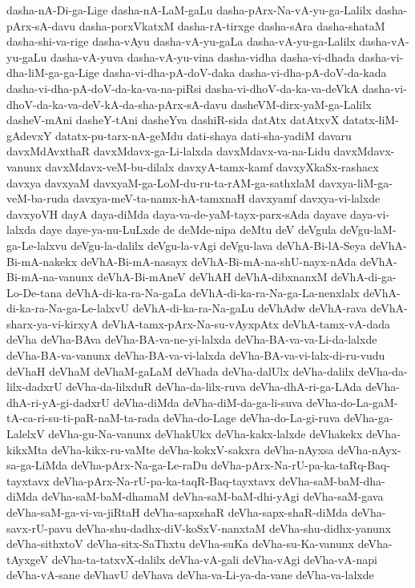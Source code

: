 {dasha-nA-Di-ga-Lige
dasha-nA-LaM-gaLu
dasha-pArx-Na-vA-yu-ga-Lalilx
dasha-pArx-sA-davu
dasha-porxVkatxM
dasha-rA-tirxge
dasha-sAra
dasha-shataM
dasha-shi-va-rige
dasha-vAyu
dasha-vA-yu-gaLa
dasha-vA-yu-ga-Lalilx
dasha-vA-yu-gaLu
dasha-vA-yuva
dasha-vA-yu-vina
dasha-vidha
dasha-vi-dhada
dasha-vi-dha-liM-ga-ga-Lige
dasha-vi-dha-pA-doV-daka
dasha-vi-dha-pA-doV-da-kada
dasha-vi-dha-pA-doV-da-ka-va-na-piRsi
dasha-vi-dhoV-da-ka-va-deVkA
dasha-vi-dhoV-da-ka-va-deV-kA-da-sha-pArx-sA-davu
dasheVM-dirx-yaM-ga-Lalilx
dasheV-mAni
dasheY-tAni
dasheYva
dashiR-sida
datAtx
datAtxvX
datatx-liM-gAdevxY
datatx-pu-tarx-nA-geMdu
dati-shaya
dati-sha-yadiM
davaru
davxMdAvxthaR
davxMdavx-ga-Li-lalxda
davxMdavx-va-na-Lidu
davxMdavx-vanunx
davxMdavx-veM-bu-dilalx
davxyA-tamx-kamf
davxyXkaSx-rashacx
davxya
davxyaM
davxyaM-ga-LoM-du-ru-ta-rAM-ga-sathxlaM
davxya-liM-ga-veM-ba-ruda
davxya-meV-ta-namx-hA-tamxnaH
davxyamf
davxya-vi-lalxde
davxyoVH
dayA
daya-diMda
daya-va-de-yaM-tayx-parx-sAda
dayave
daya-vi-lalxda
daye
daye-ya-nu-LuLxde
de
deMde-nipa
deMtu
deV
deVgula
deVgu-laM-ga-Le-lalxvu
deVgu-la-dalilx
deVgu-la-vAgi
deVgu-lava
deVhA-Bi-lA-Seya
deVhA-Bi-mA-nakekx
deVhA-Bi-mA-nasayx
deVhA-Bi-mA-na-shU-nayx-nAda
deVhA-Bi-mA-na-vanunx
deVhA-Bi-mAneV
deVhAH
deVhA-dibxnanxM
deVhA-di-ga-Lo-De-tana
deVhA-di-ka-ra-Na-gaLa
deVhA-di-ka-ra-Na-ga-La-nenxlalx
deVhA-di-ka-ra-Na-ga-Le-lalxvU
deVhA-di-ka-ra-Na-gaLu
deVhAdw
deVhA-rava
deVhA-sharx-ya-vi-kirxyA
deVhA-tamx-pArx-Na-su-vAyxpAtx
deVhA-tamx-vA-dada
deVha
deVha-BAva
deVha-BA-va-ne-yi-lalxda
deVha-BA-va-va-Li-da-lalxde
deVha-BA-va-vanunx
deVha-BA-va-vi-lalxda
deVha-BA-va-vi-lalx-di-ru-vudu
deVhaH
deVhaM
deVhaM-gaLaM
deVhada
deVha-dalUlx
deVha-dalilx
deVha-da-lilx-dadxrU
deVha-da-lilxduR
deVha-da-lilx-ruva
deVha-dhA-ri-ga-LAda
deVha-dhA-ri-yA-gi-dadxrU
deVha-diMda
deVha-diM-da-ga-li-suva
deVha-do-La-gaM-tA-ca-ri-su-ti-paR-naM-ta-rada
deVha-do-Lage
deVha-do-La-gi-ruva
deVha-ga-LalelxV
deVha-gu-Na-vanunx
deVhakUkx
deVha-kakx-lalxde
deVhakekx
deVha-kikxMta
deVha-kikx-ru-vaMte
deVha-kokxV-sakxra
deVha-nAyxsa
deVha-nAyx-sa-ga-LiMda
deVha-pArx-Na-ga-Le-raDu
deVha-pArx-Na-rU-pa-ka-taRq-Baq-tayxtavx
deVha-pArx-Na-rU-pa-ka-taqR-Baq-tayxtavx
deVha-saM-baM-dha-diMda
deVha-saM-baM-dhamaM
deVha-saM-baM-dhi-yAgi
deVha-saM-gava
deVha-saM-ga-vi-va-jiRtaH
deVha-sapxshaR
deVha-sapx-shaR-diMda
deVha-savx-rU-pavu
deVha-shu-dadhx-diV-koSxV-nanxtaM
deVha-shu-didhx-yanunx
deVha-sithxtoV
deVha-sitx-SaThxtu
deVha-suKa
deVha-su-Ka-vanunx
deVha-tAyxgeV
deVha-ta-tatxvX-dalilx
deVha-vA-gali
deVha-vAgi
deVha-vA-napi
deVha-vA-sane
deVhavU
deVhava
deVha-va-Li-ya-da-vane
deVha-va-lalxde
}
